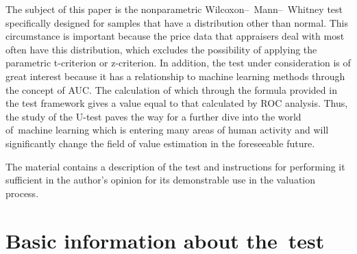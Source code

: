 \documentclass[]{scrreprt}
\begin{document}
The subject of this paper is the nonparametric Wilcoxon--~Mann--~Whitney test specifically designed for samples that have a distribution other than normal. This circumstance is important because the price data that appraisers deal with most often have this distribution, which excludes the possibility of applying the parametric t-criterion or z-criterion. In addition, the test under consideration is of great interest because it has a relationship to machine learning methods through the concept of AUC. The calculation of which through the formula provided in the test framework gives a value equal to that calculated by ROC analysis. Thus, the study of the U-test paves the way for a further dive into the world of~machine learning which is entering many areas of human activity and will significantly change the field of value estimation in the foreseeable future.

The material contains a description of the test and instructions for performing it sufficient in the author's opinion for its demonstrable use in the valuation process.
%
\chapter{Basic information about the~test}
\end{document}
